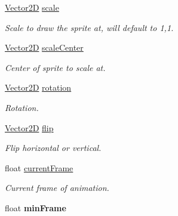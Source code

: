 \begin{DoxyCompactItemize}
\hyperlink{struct_vector2_d}{Vector2D} \hyperlink{structentity__s_a9bb7d1a12c06b6cb82ee526b976bf44a}{scale}
\begin{DoxyCompactList}\small\item\em Scale to draw the sprite at, will default to 1,1. \end{DoxyCompactList}\item 
\mbox{\label{structentity__s_a0ef27dcd4ae2dcb5d7d8d5f91d71f55b}} 
\hyperlink{struct_vector2_d}{Vector2D} \hyperlink{structentity__s_a0ef27dcd4ae2dcb5d7d8d5f91d71f55b}{scale\+Center}
\begin{DoxyCompactList}\small\item\em Center of sprite to scale at. \end{DoxyCompactList}\item 
\mbox{\label{structentity__s_a4b569747d882af629a46056eb49f8a6c}} 
\hyperlink{struct_vector2_d}{Vector2D} \hyperlink{structentity__s_a4b569747d882af629a46056eb49f8a6c}{rotation}
\begin{DoxyCompactList}\small\item\em Rotation. \end{DoxyCompactList}\item 
\mbox{\label{structentity__s_ac4e79a19c0a94b6e483a543063e2f753}} 
\hyperlink{struct_vector2_d}{Vector2D} \hyperlink{structentity__s_ac4e79a19c0a94b6e483a543063e2f753}{flip}
\begin{DoxyCompactList}\small\item\em Flip horizontal or vertical. \end{DoxyCompactList}\item 
\mbox{\label{structentity__s_a98eb315f1b58fd10ebb47150b1b8dcd7}} 
float \hyperlink{structentity__s_a98eb315f1b58fd10ebb47150b1b8dcd7}{current\+Frame}
\begin{DoxyCompactList}\small\item\em Current frame of animation. \end{DoxyCompactList}\item 
\mbox{\label{structentity__s_a402032fb043e7ae447afc2fdca7bbb6b}} 
float {\bfseries min\+Frame}
\item 
\mbox{\label{structentity__s_a45b9efb30402924e009bb268ef6a1f8d}} 

\end{DoxyCompactItemize}

